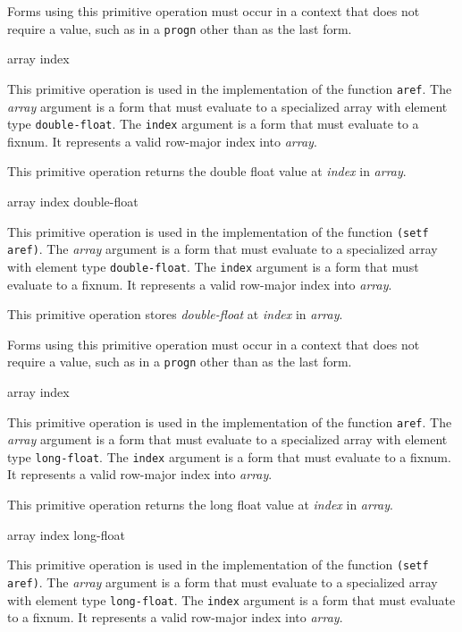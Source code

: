 Forms using this primitive operation must occur in a context that does
not require a value, such as in a \texttt{progn} other than as the
last form.

 {array index}

This primitive operation is used in the implementation of the
\commonlisp{} function \texttt{aref}.  The \textit{array} argument is
a form that must evaluate to a specialized array with element type
\texttt{double-float}.  The \texttt{index} argument is a form that must
evaluate to a fixnum.  It represents a valid row-major index into
\textit{array}.

This primitive operation returns the double float value at
\textit{index} in \textit{array}.

 {array index double-float}

This primitive operation is used in the implementation of the
\commonlisp{} function \texttt{(setf aref)}.  The \textit{array}
argument is a form that must evaluate to a specialized array with
element type \texttt{double-float}.  The \texttt{index} argument is a
form that must evaluate to a fixnum.  It represents a valid row-major
index into \textit{array}.

This primitive operation stores \textit{double-float} at \textit{index}
in \textit{array}.

Forms using this primitive operation must occur in a context that does
not require a value, such as in a \texttt{progn} other than as the
last form.

 {array index}

This primitive operation is used in the implementation of the
\commonlisp{} function \texttt{aref}.  The \textit{array} argument is
a form that must evaluate to a specialized array with element type
\texttt{long-float}.  The \texttt{index} argument is a form that must
evaluate to a fixnum.  It represents a valid row-major index into
\textit{array}.

This primitive operation returns the long float value at
\textit{index} in \textit{array}.

 {array index long-float}

This primitive operation is used in the implementation of the
\commonlisp{} function \texttt{(setf aref)}.  The \textit{array}
argument is a form that must evaluate to a specialized array with
element type \texttt{long-float}.  The \texttt{index} argument is a
form that must evaluate to a fixnum.  It represents a valid row-major
index into \textit{array}.

